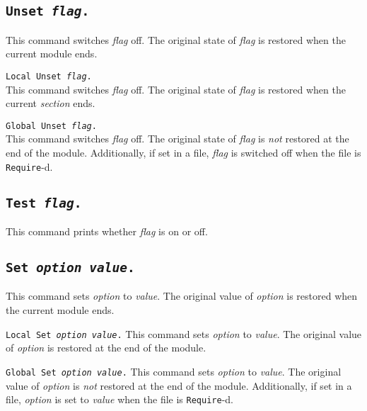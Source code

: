 \subsection[\tt Unset {\rm\sl flag}.]{\tt Unset {\rm\sl flag}.}
This command switches {\rm\sl flag} off. The original state of {\rm\sl flag}
is restored when the current module ends.

\begin{Variants}
\item {\tt Local Unset {\rm\sl flag}.}\\
This command switches {\rm\sl flag} off. The original state of {\rm\sl flag}
is restored when the current \emph{section} ends.
\item {\tt Global Unset {\rm\sl flag}.}\\
This command switches {\rm\sl flag} off.  The original state of
{\rm\sl flag} is \emph{not} restored at the end of the module. Additionally,
if set in a file, {\rm\sl flag} is switched off when the file is
{\tt Require}-d.
\end{Variants}

\subsection[\tt Test {\rm\sl flag}.]{\tt Test {\rm\sl flag}.}
This command prints whether {\rm\sl flag} is on or off.

\subsection[\tt Set {\rm\sl option} {\rm\sl value}.]{\tt Set {\rm\sl option} {\rm\sl value}.}
This command sets {\rm\sl option} to {\rm\sl value}. The original value of
{\rm\sl option} is restored when the current module ends.

\begin{Variants}
\item {\tt Local Set {\rm\sl option} {\rm\sl value}.}
This command sets {\rm\sl option} to {\rm\sl value}. The original value of
{\rm\sl option} is restored at the end of the module.
\item {\tt Global Set {\rm\sl option} {\rm\sl value}.}
This command sets {\rm\sl option} to {\rm\sl value}. The original value of
{\rm\sl option} is \emph{not} restored at the end of the module. Additionally,
if set in a file, {\rm\sl option} is set to {\rm\sl value} when the file is
{\tt Require}-d.
\end{Variants}

